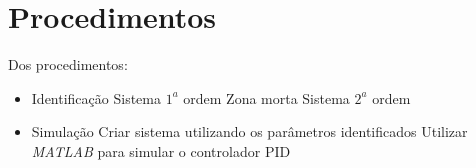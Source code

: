 \section{Procedimentos}
    Dos procedimentos:
    
    \begin{itemize}
        \item Identificação
        \subitem Sistema $1^a$ ordem
        \subitem Zona morta
        \subitem Sistema $2^a$ ordem
        \item Simulação
        \subitem Criar sistema utilizando os parâmetros identificados
        \subitem Utilizar \textit{MATLAB} para simular o controlador PID
    \end{itemize}
    